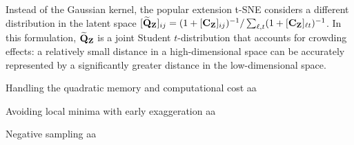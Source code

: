 


Instead of the Gaussian kernel, the popular extension t-SNE \citep{van2008visualizing} considers a different distribution in the latent space $[\widetilde{\mathbf{Q}}_{\mathbf{Z}}]_{ij} = (1 + [\mathbf{C}_{\mathbf{Z}}]_{ij})^{-1}/\sum_{\ell,t}(1 +
[\mathbf{C}_{\mathbf{Z}}]_{\ell t})^{-1}$. In this formulation, $\widetilde{\mathbf{Q}}_{\mathbf{Z}}$ is a joint
Student $t$-distribution that accounts for crowding effects: a relatively small
distance in a high-dimensional space can be accurately represented by a
significantly greater distance in the low-dimensional space.  

\begin{rem2}{Handling the quadratic memory and computational cost}
    aa
\end{rem2}

\begin{rem2}{Avoiding local minima with early exaggeration}
    aa
\end{rem2}

\begin{rem2}{Negative sampling}
    aa
\end{rem2}